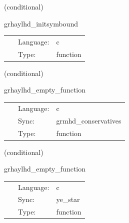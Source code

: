 \vspace{5mm}

   (conditional) 

\hspace{5mm} grhaylhd\_initsymbound 

\hspace{5mm}{\it schedule symmetries } 


\hspace{5mm}

 \begin{tabular*}{160mm}{cll} 
~ & Language:  & c \\ 
~ & Type:  & function \\ 
\end{tabular*} 


\vspace{5mm}

   (conditional) 

\hspace{5mm} grhaylhd\_empty\_function 

\hspace{5mm}{\it sync required conservatives } 


\hspace{5mm}

 \begin{tabular*}{160mm}{cll} 
~ & Language:  & c \\ 
~ & Sync:  & grmhd\_conservatives \\ 
~ & Type:  & function \\ 
\end{tabular*} 


\vspace{5mm}

   (conditional) 

\hspace{5mm} grhaylhd\_empty\_function 

\hspace{5mm}{\it sync allocated electron-fraction conservatives } 


\hspace{5mm}

 \begin{tabular*}{160mm}{cll} 
~ & Language:  & c \\ 
~ & Sync:  & ye\_star \\ 
~ & Type:  & function \\ 
\end{tabular*} 


